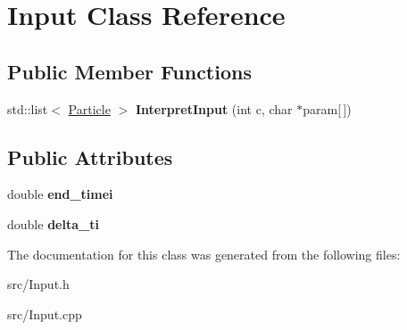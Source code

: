 \hypertarget{class_input}{}\section{Input Class Reference}
\label{class_input}
\subsection*{Public Member Functions}
\begin{DoxyCompactItemize}
\item 
\mbox{\label{class_input_aceecd12aad47433477cfc32743c41743}} 
std\+::list$<$ \mbox{\hyperlink{class_particle}{Particle}} $>$ {\bfseries Interpret\+Input} (int c, char $\ast$param\mbox{[}$\,$\mbox{]})
\end{DoxyCompactItemize}
\subsection*{Public Attributes}
\begin{DoxyCompactItemize}
\item 
\mbox{\label{class_input_a3d93c2a1146f4e8f544208d6d68073e5}} 
double {\bfseries end\+\_\+timei}
\item 
\mbox{\label{class_input_a2e63e0524d1a0648e6d1b805fff41c5d}} 
double {\bfseries delta\+\_\+ti}
\end{DoxyCompactItemize}


The documentation for this class was generated from the following files\+:\begin{DoxyCompactItemize}
\item 
src/Input.\+h\item 
src/Input.\+cpp\end{DoxyCompactItemize}

